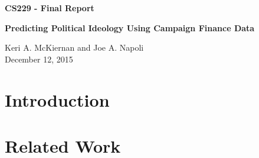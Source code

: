 \documentclass[10]{article}
\begin{document}
\begin{center}
\huge{\textbf{CS229 - Final Report}} \\
\end{center}
\begin{center}
\huge{\textbf{Predicting Political Ideology Using Campaign Finance Data}} \\
\end{center}
\begin{center}
\large{Keri A. McKiernan and Joe A. Napoli \\
\vspace{.25em}
December 12, 2015}
\end{center}
\section*{Introduction}

\section*{Related Work}
\end{document}
